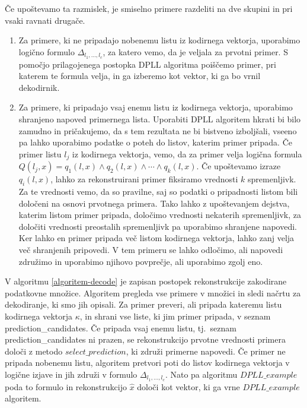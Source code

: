 \documentclass[12pt,a4paper,twoside]{article}
\theoremstyle{definition} %
\theoremstyle{plain} %
\numberwithin{equation}{section}  %
\begin{document}
Če upoštevamo ta razmislek, je smiselno primere razdeliti na dve skupini in pri vsaki ravnati drugače.
\begin{enumerate} %
	\item Za primere, ki ne pripadajo nobenemu listu iz kodirnega vektorja,
	uporabimo logično formulo $\Delta_{l_1,\ldots,l_c}$, za katero vemo, da je veljala za prvotni primer.
	S pomočjo prilagojenega postopka DPLL algoritma poiščemo primer, pri katerem te formula velja, in ga izberemo kot vektor, ki ga bo vrnil dekodirnik.

	\item Za primere, ki pripadajo vsaj enemu listu iz kodirnega vektorja, uporabimo shranjeno napoved primernega lista.
	Uporabiti DPLL algoritem hkrati bi bilo zamudno in pričakujemo, da s tem rezultata ne bi bistveno izboljšali, vseeno pa lahko uporabimo podatke o poteh do listov, katerim primer pripada.
	Če primer listu $l_j$ iz kodirnega vektorja, vemo, da za primer velja logična formula $Q(l_j,x) = q_1(l,x) \land q_2(l,x) \land \cdots \land q_k(l,x)$. %
	Če upoštevamo izraze $q_i(l,x)$, lahko za rekonstruirani primer fiksiramo vrednosti $k$ spremenljivk.
	Za te vrednosti vemo, da so pravilne, saj so podatki o pripadnosti listom bili določeni na osnovi prvotnega primera.
	Tako lahko z upoštevanjem dejstva, katerim listom primer pripada, določimo vrednosti nekaterih spremenljivk, za določiti vrednosti preostalih spremenljivk pa uporabimo shranjene napovedi.
	Ker lahko en primer pripada več listom kodirnega vektorja, lahko zanj velja več shranjenih pripovedi.
	V tem primeru se lahko odločimo, ali napovedi združimo in uporabimo njihovo povprečje, ali uporabimo zgolj eno.
\end{enumerate}

V algoritmu \ref{algoritem-decode} je zapisan postopek rekonstrukcije zakodirane podatkovne množice.
Algoritem pregleda vse primere v množici in sledi načrtu za dekodiranje, ki smo jih opisali.
Za primer preveri, ali pripada kateremu listu kodirnega vektorja $\kappa$, in shrani vse liste, ki jim primer pripada, v seznam prediction\_candidates.
Če pripada vsaj enemu listu, tj.~seznam prediction\_candidates ni prazen, se rekonstrukcijo prvotne vrednosti primera določi z metodo $select\_prediction$, ki združi primerne napovedi.
Če primer ne pripada nobenemu listu, algoritem pretvori poti do listov kodirnega vektorja v logične izjave in jih združi v formulo $\Delta_{l_1,\ldots,l_c}$.
Nato pa algoritmu $DPLL\_example$ poda to formulo in rekonstrukcijo $\hat{x}$ določi kot vektor, ki ga vrne $DPLL\_example$ algoritem. %
\end{document}
